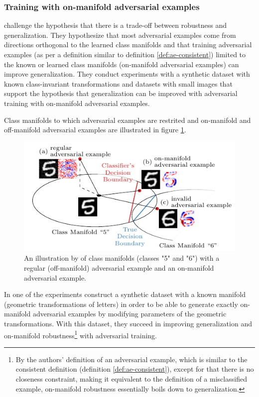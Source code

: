 \documentclass[twocolumn]{article}
\begin{document}
\subsubsection{Training with on-manifold adversarial examples}

\citet{Stutz:2018:DARG} challenge the hypothesis that there is a trade-off between robustness and generalization. They hypothesize that most adversarial examples come from directions orthogonal to the learned class manifolds and that training adversarial examples (as per a definition similar to definition \ref{def:ae-consistent}) limited to the known or learned class manifolds (on-manifold adversarial examples) can improve generalization. They conduct experiments with a synthetic dataset with known class-invariant transformations and datasets with small images that support the hypothesis that generalization can be improved with adversarial training with on-manifold adversarial examples.

Class manifolds to which adversarial examples are restrited and on-manifold and off-manifold adversarial examples are illustrated in figure \ref{fig:stutz-illustration}.

\begin{figure}
	\begin{center}
		\includegraphics[width=\columnwidth]{figures/adversarial-examples/stutz-introduction_b.pdf}
	\end{center}
	\caption{An illustration by \citet{Stutz:2018:DARG} of class manifolds (classes "5" and "6") with a regular (off-manifold) adversarial example and an on-manifold adversarial example.}
	\label{fig:stutz-illustration}
\end{figure}

In one of the experiments \citet{Stutz:2018:DARG} construct a synthetic dataset with a known manifold (geometric transformations of letters) in order to be able to generate exactly on-manifold adversarial examples by modifying parameters of the geometric transformations. With this dataset, they succeed in improving generalization and on-manifold robustness\footnote{By the authors' definition of an adversarial example, which is similar to the consistent definition (definition \ref{def:ae-consistent}), except for that there is no closeness constraint, making it equivalent to the definition of a misclassified example, on-manifold robustness essentially boils down to generalization.} with adversarial training.
\end{document}
